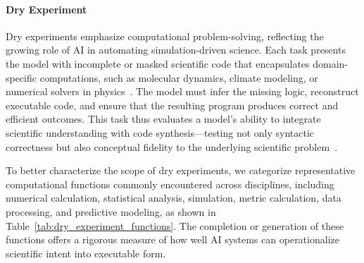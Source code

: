 \paragraph{Dry Experiment}
Dry experiments emphasize computational problem-solving, reflecting the growing role of AI in automating simulation-driven science. Each task presents the model with incomplete or masked scientific code that encapsulates domain-specific computations, such as molecular dynamics, climate modeling, or numerical solvers in physics~\cite{cox2025mdcrow}. The model must infer the missing logic, reconstruct executable code, and ensure that the resulting program produces correct and efficient outcomes. This task thus evaluates a model's ability to integrate scientific understanding with code synthesis—testing not only syntactic correctness but also conceptual fidelity to the underlying scientific problem~\cite{tian2024scicoderesearchcodingbenchmark}.

To better characterize the scope of dry experiments, we categorize representative computational functions commonly encountered across disciplines, including numerical calculation, statistical analysis, simulation, metric calculation, data processing, and predictive modeling, as shown in Table~\ref{tab:dry_experiment_functions}. The completion or generation of these functions offers a rigorous measure of how well AI systems can operationalize scientific intent into executable form.

\begin{table}[ht]
\centering
\caption{\textbf{Dry Experiment Function Types}: Representative computational functions and their roles across scientific code-completion tasks.}
\label{tab:dry_experiment_functions}
\end{table}


